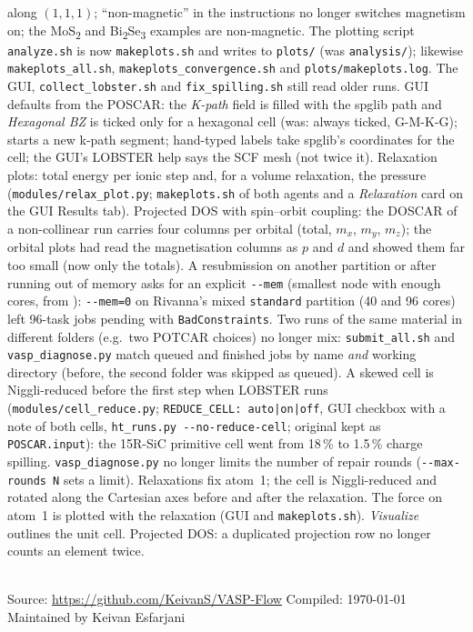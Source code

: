 \documentclass[11pt,a4paper]{scrartcl}
\newcommand{\cmd}[1]{\texttt{\detokenize{#1}}}
\begin{document}
\begin{description}
    along $(1,1,1)$; ``non-magnetic'' in the instructions no longer switches magnetism on; the
    MoS\textsubscript{2} and Bi\textsubscript{2}Se\textsubscript{3} examples are non-magnetic.
    The plotting script \texttt{analyze.sh} is now \texttt{makeplots.sh} and writes to
    \texttt{plots/} (was \texttt{analysis/}); likewise \texttt{makeplots\_all.sh},
    \texttt{makeplots\_convergence.sh} and \texttt{plots/makeplots.log}.  The GUI,
    \texttt{collect\_lobster.sh} and \texttt{fix\_spilling.sh} still read older runs.
    GUI defaults from the POSCAR: the \emph{K-path} field is filled with the spglib path and
    \emph{Hexagonal BZ} is ticked only for a hexagonal cell (was: always ticked, G-M-K-G);
    \cmd{|} starts a new k-path segment; hand-typed labels take spglib's coordinates for the
    cell; the GUI's LOBSTER help says the SCF mesh (not twice it).
    Relaxation plots: total energy per ionic step and, for a volume relaxation, the pressure
    (\texttt{modules/relax\_plot.py}; \texttt{makeplots.sh} of both agents and a
    \emph{Relaxation} card on the GUI Results tab).
    Projected DOS with spin--orbit coupling: the DOSCAR of a non-collinear run carries four
    columns per orbital (total, $m_x$, $m_y$, $m_z$); the orbital plots had read the
    magnetisation columns as $p$ and $d$ and showed them far too small (now only the totals).
    A resubmission on another partition or after running out of memory asks for an explicit
    \texttt{-{}-mem} (smallest node with enough cores, from \cmd{sinfo}): \texttt{-{}-mem=0} on
    Rivanna's mixed \texttt{standard} partition (40 and 96 cores) left 96-task jobs pending
    with \texttt{BadConstraints}.
    Two runs of the same material in different folders (e.g.\ two POTCAR choices) no longer
    mix: \texttt{submit\_all.sh} and \texttt{vasp\_diagnose.py} match queued and finished jobs
    by name \emph{and} working directory (before, the second folder was skipped as queued).
    A skewed cell is Niggli-reduced before the first step when LOBSTER runs
    (\texttt{modules/cell\_reduce.py}; \texttt{REDUCE\_CELL: auto|on|off}, GUI checkbox with a
    note of both cells, \texttt{ht\_runs.py -{}-no-reduce-cell}; original kept as
    \texttt{POSCAR.input}): the 15R-SiC primitive cell went from 18\,\% to 1.5\,\% charge
    spilling.  \texttt{vasp\_diagnose.py} no longer limits the number of repair rounds
    (\texttt{-{}-max-rounds N} sets a limit).
    Relaxations fix atom~1; the cell is Niggli-reduced and rotated along the Cartesian axes
    before and after the relaxation.  The force on atom~1 is plotted with the relaxation
    (GUI and \texttt{makeplots.sh}).  \emph{Visualize} outlines the unit cell.  Projected DOS:
    a duplicated projection row no longer counts an element twice.
\end{description}

\vfill
\noindent{\color{mainblue}\rule{\linewidth}{0.5pt}}\\[4pt]
\noindent\small
Source: \url{https://github.com/KeivanS/VASP-Flow}\hfill
Compiled: \today\hfill
Maintained by Keivan Esfarjani
\end{document}
